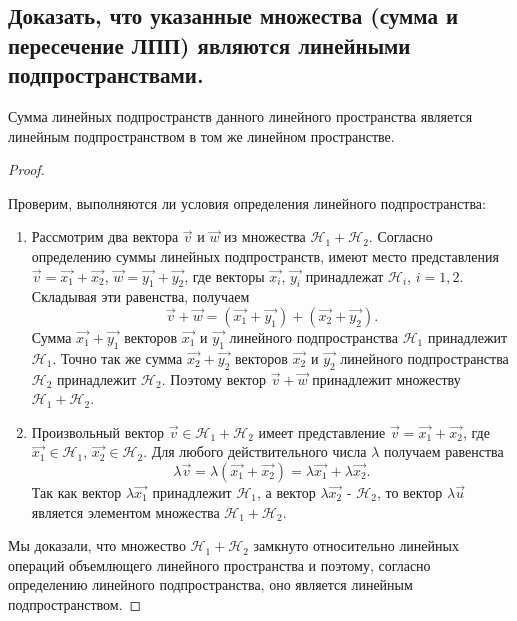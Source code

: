 \newpage


\subsection{
    Доказать, что указанные множества (сумма и пересечение ЛПП) являются линейными подпространствами.
}

\begin{theorem}
    Сумма линейных подпространств данного линейного пространства является линейным подпространством в том же линейном пространстве.
\end{theorem}

\begin{proof}~

    Проверим, выполняются ли условия определения линейного подпространства:
    \begin{enumerate}[nosep]
        \item Рассмотрим два вектора $\vec{v}$ и $\vec{w}$ из множества $\mathcal{H}_1 + \mathcal{H}_2$. Согласно определению суммы линейных подпространств, имеют место представления $\vec{v} = \vec{x_1} + \vec{x_2}$, $\vec{w} = \vec{y_1} + \vec{y_2}$, где векторы $\vec{x_i}$, $\vec{y_i}$ принадлежат $\mathcal{H}_i$, $i = 1, 2$. Складывая эти равенства, получаем
        $$\vec{v} + \vec{w} = (\vec{x_1} + \vec{y_1}) + (\vec{x_2} + \vec{y_2}).$$
        Сумма $\vec{x_1} + \vec{y_1}$ векторов $\vec{x_1}$ и $\vec{y_1}$ линейного подпространства $\mathcal{H}_1$ принадлежит $\mathcal{H}_1$. Точно так же сумма $\vec{x_2} + \vec{y_2}$ векторов $\vec{x_2}$ и $\vec{y_2}$ линейного подпространства $\mathcal{H}_2$ принадлежит $\mathcal{H}_2$. Поэтому вектор $\vec{v} + \vec{w}$ принадлежит множеству $\mathcal{H}_1 + \mathcal{H}_2$.
        \item Произвольный вектор $\vec{v} \in \mathcal{H}_1 + \mathcal{H}_2$ имеет представление $\vec{v} = \vec{x_1} + \vec{x_2}$, где $\vec{x_1} \in \mathcal{H}_1$, $\vec{x_2} \in \mathcal{H}_2$. Для любого действительного числа $\lambda$ получаем равенства 
        $$\lambda \vec{v} = \lambda (\vec{x_1} + \vec{x_2}) = \lambda \vec{x_1} + \lambda \vec{x_2}.$$
        Так как вектор $\lambda \vec{x_1}$ принадлежит $\mathcal{H}_1$, а вектор $\lambda \vec{x_2}$ - $\mathcal{H}_2$, то вектор $\lambda \vec{u}$ является элементом множества $\mathcal{H}_1 + \mathcal{H}_2$.
    \end{enumerate}
    Мы доказали, что множество $\mathcal{H}_1 + \mathcal{H}_2$ замкнуто относительно линейных операций объемлющего линейного пространства и поэтому, согласно определению линейного подпространства, оно является линейным подпространством.
\end{proof}

